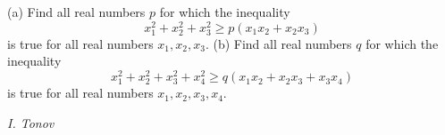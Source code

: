 (a) Find all real numbers $p$ for which the inequality
$$x_1^2+x_2^2+x_3^2\ge p(x_1x_2+x_2x_3)$$is true for all real numbers $x_1,x_2,x_3$.
(b) Find all real numbers $q$ for which the inequality
$$x_1^2+x_2^2+x_3^2+x_4^2\ge q(x_1x_2+x_2x_3+x_3x_4)$$is true for all real numbers $x_1,x_2,x_3,x_4$.

\textit{I. Tonov}